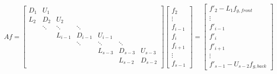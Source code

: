 \documentclass[11pt]{article}
\begin{document}
\[ Af = \left[
\begin{array}{ccccccccc}
D_{1} & U_{1}    &           &           &           &           &         \\
L_{2} & D_{2}    & U_{2}     &           &           &           &         \\
      & \ddots   & \ddots    & \ddots    &           &           &         \\
      &          & L_{i-1}   & D_{i-1}   & U_{i-1}   &           &         \\
      &          &           & \ddots    & \ddots    & \ddots    &         \\
      &          &           &           & L_{s-3}   & D_{s-3}   & U_{s-3} \\
      &          &           &           &           & L_{s-2}   & D_{s-2} \\
\end{array} \right]
\left[ \begin{array}{c}
f_{2} \\ \vdots \\ f_{i-1} \\ f_{i} \\ f_{i+1} \\ \vdots \\ f_{s-1}
\end{array} \right]
=
\left[ \begin{array}{c}
f'_{2} - L_1 f_{g,front} \\ \vdots \\
f'_{i-1} \\ f'_{i} \\ f'_{i+1} \\ \vdots \\ f'_{s-1} - U_{s-2} f_{g,back}
\end{array} \right]
\]
\end{document}
